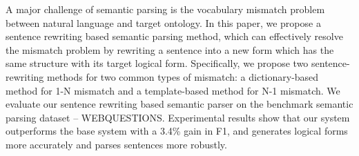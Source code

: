 A major challenge of semantic parsing is the vocabulary mismatch problem between natural language and target ontology. In this paper, we propose a sentence rewriting based semantic parsing method, which can effectively resolve the mismatch problem by rewriting a sentence into a new form which has the same structure with its target logical form. Specifically, we propose two sentence-rewriting methods for two common types of mismatch: a dictionary-based method for 1-N mismatch and a template-based method for N-1 mismatch. We evaluate our sentence rewriting based semantic parser on the benchmark semantic parsing dataset -- WEBQUESTIONS. Experimental results show that our system outperforms the base system with a 3.4\% gain in F1, and generates logical forms more accurately and parses sentences more robustly.
